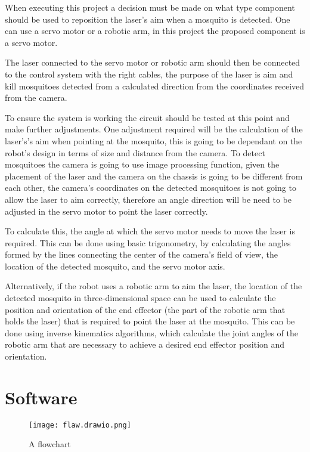\documentclass[11pt]{article}
\begin{document}
 	When executing this project a decision must be made on what type component should be used to reposition the laser's aim when a mosquito is detected. One can use a servo motor or a robotic arm, in this project the proposed component is a servo motor.
 	
 	


 The laser connected to the servo motor or robotic arm should then be connected to the control system with the right cables, the purpose of the laser is aim and kill mosquitoes detected from a calculated direction from the coordinates received from the camera.
 
 To ensure the system is working the circuit should be tested at this point and make further adjustments.
 	One adjustment required will be the calculation of the laser's's aim when pointing at the mosquito, this is going to be dependant on the robot's design in terms of size and distance from the camera. To detect mosquitoes the camera is going to use image processing function, given the placement of the laser and the camera  on the chassis is going to be different from each other, the camera's coordinates on the detected mosquitoes is not going to allow the laser to aim correctly, therefore an angle direction will be need to be adjusted in the servo motor to point the laser correctly.
 	
 	
 	To calculate this, the angle at which the servo motor needs to move the laser is required. This can be done using basic trigonometry, by calculating the angles formed by the lines connecting the center of the camera's field of view, the location of the detected mosquito, and the servo motor axis.
 	
 	Alternatively, if the robot uses a robotic arm to aim the laser, the location of the detected mosquito in three-dimensional space  can be used to calculate the position and orientation of the end effector (the part of the robotic arm that holds the laser) that is required to point the laser at the mosquito. This can be done using inverse kinematics algorithms, which calculate the joint angles of the robotic arm that are necessary to achieve a desired end effector position and orientation.
 	

 
 \section{Software}
 
 \begin{center}
 	
 	
 	\begin{figure}[H]
 		\centering
 		\texttt{[image: flaw.drawio.png]}
 		\caption{A flowchart  }
 		\label{fig:Flowchart}
 	\end{figure}
 \end{center}
 
\end{document}
